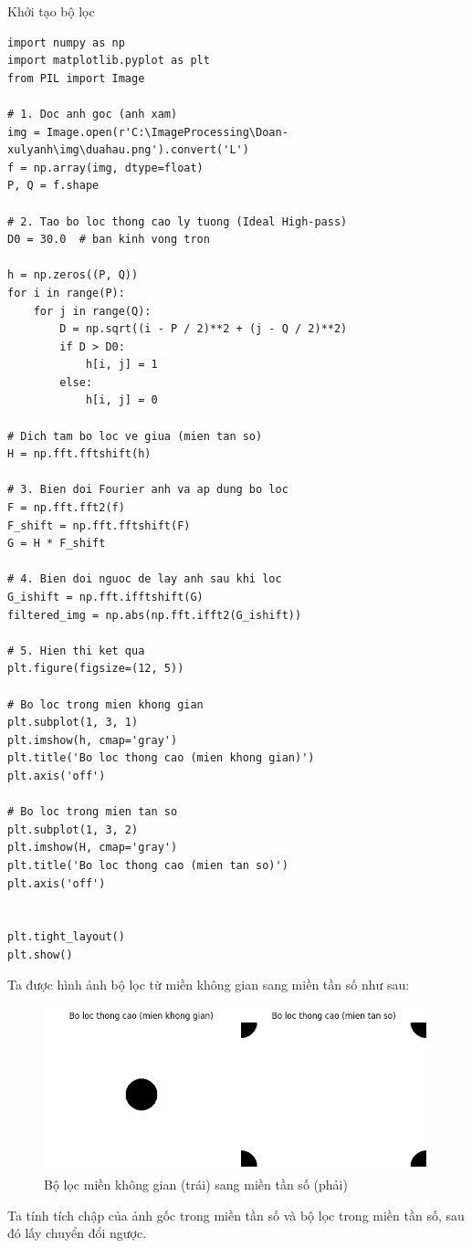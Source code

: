 \documentclass[12pt,a4paper]{report}
\numberwithin{equation}{section}
\theoremstyle{definition} %
\begin{document}
Khởi tạo bộ lọc 
\begin{lstlisting}
import numpy as np
import matplotlib.pyplot as plt
from PIL import Image

# 1. Doc anh goc (anh xam)
img = Image.open(r'C:\ImageProcessing\Doan-xulyanh\img\duahau.png').convert('L')
f = np.array(img, dtype=float)
P, Q = f.shape

# 2. Tao bo loc thong cao ly tuong (Ideal High-pass)
D0 = 30.0  # ban kinh vong tron

h = np.zeros((P, Q))
for i in range(P):
    for j in range(Q):
        D = np.sqrt((i - P / 2)**2 + (j - Q / 2)**2)
        if D > D0:
            h[i, j] = 1
        else:
            h[i, j] = 0

# Dich tam bo loc ve giua (mien tan so)
H = np.fft.fftshift(h)

# 3. Bien doi Fourier anh va ap dung bo loc
F = np.fft.fft2(f)
F_shift = np.fft.fftshift(F)
G = H * F_shift

# 4. Bien doi nguoc de lay anh sau khi loc
G_ishift = np.fft.ifftshift(G)
filtered_img = np.abs(np.fft.ifft2(G_ishift))

# 5. Hien thi ket qua
plt.figure(figsize=(12, 5))

# Bo loc trong mien khong gian
plt.subplot(1, 3, 1)
plt.imshow(h, cmap='gray')
plt.title('Bo loc thong cao (mien khong gian)')
plt.axis('off')

# Bo loc trong mien tan so
plt.subplot(1, 3, 2)
plt.imshow(H, cmap='gray')
plt.title('Bo loc thong cao (mien tan so)')
plt.axis('off')


plt.tight_layout()
plt.show()
\end{lstlisting}
Ta được hình ảnh bộ lọc từ miền không gian sang miền tần số như sau:

\begin{figure}[H]
\centering
\includegraphics[width=0.8\linewidth]{img/idealhighpass/IHPF-bolocKG-bolocTS.png}
\caption{Bộ lọc miền không gian (trái) sang miền tần số (phải)}
\label{fig129}
\end{figure}
Ta tính tích chập của ảnh gốc trong miền tần số và bộ lọc trong miền tần số, sau đó lấy chuyển đổi ngược.
\end{document}
